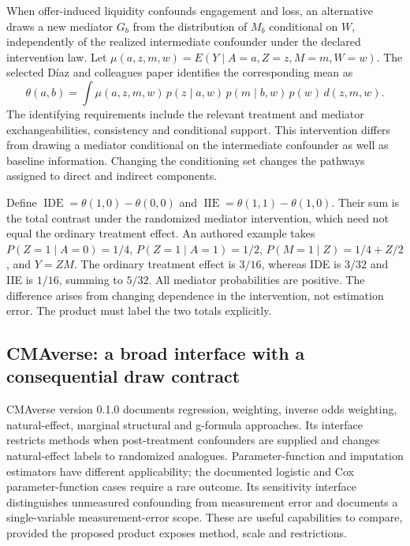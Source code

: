 When offer-induced liquidity confounds engagement and loss, an alternative
draws a new mediator $G_b$ from the distribution of $M_b$ conditional on $W$,
independently of the realized intermediate confounder under the declared
intervention law. Let $\mu(a,z,m,w)=E(Y\mid A=a,Z=z,M=m,W=w)$. The selected
D\'iaz and colleagues paper identifies the corresponding mean as
\[
 \theta(a,b)=\int \mu(a,z,m,w)\,p(z\mid a,w)\,
                  p(m\mid b,w)\,p(w)\,d(z,m,w).
\]
The identifying requirements include the relevant treatment and mediator
exchangeabilities, consistency and conditional support. This intervention
differs from drawing a mediator conditional on the intermediate confounder as
well as baseline information. Changing the conditioning set changes the
pathways assigned to direct and indirect components.
\citep{exec25_rmed_diaz_paper}

Define $\operatorname{IDE}=\theta(1,0)-\theta(0,0)$ and
$\operatorname{IIE}=\theta(1,1)-\theta(1,0)$. Their sum is the total contrast
under the randomized mediator intervention, which need not equal the ordinary
treatment effect. An authored example takes
$P(Z=1\mid A=0)=1/4$, $P(Z=1\mid A=1)=1/2$,
$P(M=1\mid Z)=1/4+Z/2$, and $Y=ZM$. The ordinary treatment effect is $3/16$,
whereas IDE is $3/32$ and IIE is $1/16$, summing to $5/32$. All mediator
probabilities are positive. The difference arises from changing dependence in
the intervention, not estimation error. The product must label the two totals
explicitly. \citep{exec25_rmed_choice}

\subsection{CMAverse: a broad interface with a consequential draw contract}

CMAverse version 0.1.0 documents regression, weighting, inverse odds weighting,
natural-effect, marginal structural and g-formula approaches. Its interface
restricts methods when post-treatment confounders are supplied and changes
natural-effect labels to randomized analogues. Parameter-function and imputation
estimators have different applicability; the documented logistic and Cox
parameter-function cases require a rare outcome. Its sensitivity interface
distinguishes unmeasured confounding from measurement error and documents a
single-variable measurement-error scope. These are useful capabilities to
compare, provided the proposed product exposes method, scale and restrictions.
\citep{exec25_rmed_cmaverse}

